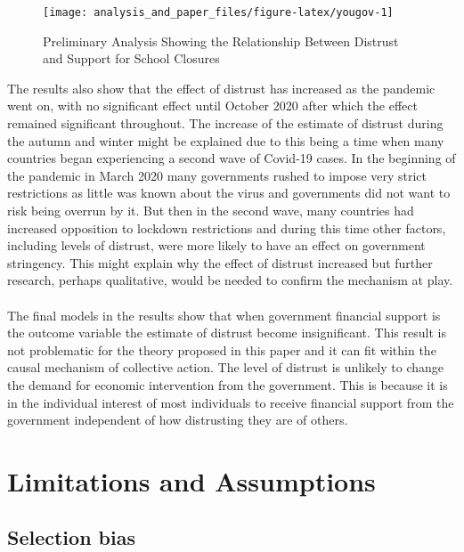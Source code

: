 \documentclass[
  12pt,
]{article}
\begin{document}
\begin{figure}
\texttt{[image: analysis\_and\_paper\_files/figure-latex/yougov-1]} \caption{Preliminary Analysis Showing the Relationship Between Distrust and Support for School Closures}\label{fig:yougov}
\end{figure}

\hfill\break
The results also show that the effect of distrust has increased as the pandemic went on, with no significant effect until October 2020 after which the effect remained significant throughout. The increase of the estimate of distrust during the autumn and winter might be explained due to this being a time when many countries began experiencing a second wave of Covid-19 cases. In the beginning of the pandemic in March 2020 many governments rushed to impose very strict restrictions as little was known about the virus and governments did not want to risk being overrun by it. But then in the second wave, many countries had increased opposition to lockdown restrictions and during this time other factors, including levels of distrust, were more likely to have an effect on government stringency. This might explain why the effect of distrust increased but further research, perhaps qualitative, would be needed to confirm the mechanism at play.\\
~\\
The final models in the results show that when government financial support is the outcome variable the estimate of distrust become insignificant. This result is not problematic for the theory proposed in this paper and it can fit within the causal mechanism of collective action. The level of distrust is unlikely to change the demand for economic intervention from the government. This is because it is in the individual interest of most individuals to receive financial support from the government independent of how distrusting they are of others.\\

\hypertarget{limitations-and-assumptions}{%
\section{Limitations and Assumptions}\label{limitations-and-assumptions}}

\hypertarget{selection-bias}{%
\subsection{Selection bias}\label{selection-bias}}
\end{document}
